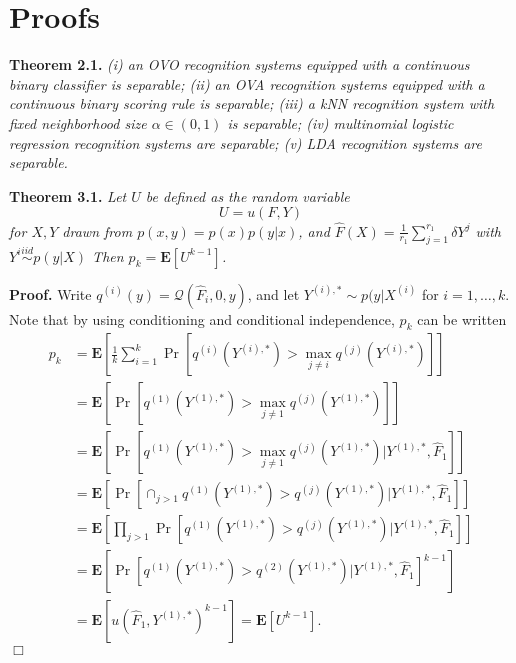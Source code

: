 \documentclass[12pt]{article}
\begin{document}
\maketitle

\newcommand{\tr}{\text{tr}}
\newcommand{\E}{\textbf{E}}
\newcommand{\diag}{\text{diag}}
\newcommand{\argmax}{\text{argmax}}
\newcommand{\Cov}{\text{Cov}}
\newcommand{\Var}{\text{Var}}
\newcommand{\argmin}{\text{argmin}}
\newcommand{\Vol}{\text{Vol}}
\newcommand{\comm}[1]{}
\newcommand{\indep}{\rotatebox[origin=c]{90}{$\models$}}
\newcommand{\Cor}{\text{Cor}}

\section{Proofs}

\textbf{Theorem 2.1.} \emph{(i) an OVO recognition systems equipped with a continuous binary classifier is separable; (ii) an OVA recognition systems equipped with a continuous binary scoring rule is separable;
(iii) a kNN recognition system with fixed neighborhood size $\alpha \in (0, 1)$ is separable; (iv) multinomial logistic regression recognition systems are separable; (v) LDA recognition systems are separable.}

\noindent\textbf{Theorem 3.1.} \emph{
Let $U$ be defined as the random variable
\[U = u(F, Y)\]
for $X, Y$ drawn from $p(x, y) = p(x) p(y|x)$,
and $\hat{F}(X) = \frac{1}{r_1}\sum_{j=1}^{r_1} \delta{Y^j}$ with $Y^i \stackrel{iid}{\sim} p(y|X)$
Then $p_k = \E[U^{k-1}]$.
}

\noindent\textbf{Proof.}  
Write $q^{(i)}(y) = \mathcal{Q}(\hat{F}_i, 0, y)$, and let $Y^{(i), *} \sim p(y|X^{(i)}$ for $i = 1,\hdots, k$.
Note that by using conditioning and
conditional independence, $p_k$ can be written
\begin{align*}
p_k &= \E\left[ \frac{1}{k}\sum_{i=1}^k  \Pr[q^{(i)}(Y^{(i), *}) > \max_{j\neq i} q^{(j)}(Y^{(i), *})] \right]
\\&= \E\left[ \Pr[q^{(1)}(Y^{(1), *}) > \max_{j\neq 1} q^{(j)}(Y^{(1), *})] \right]
\\&= \E[\Pr[q^{(1)}(Y^{(1), *}) > \max_{j\neq 1} q^{(j)}(Y^{(1), *})|Y^{(1), *}, \hat{F}_1]]
\\&= \E[\Pr[\cap_{j > 1} q^{(1)}(Y^{(1), *}) > q^{(j)}(Y^{(1), *})|Y^{(1), *}, \hat{F}_1]]
\\&= \E[\prod_{j > 1}\Pr[q^{(1)}(Y^{(1), *}) > q^{(j)}(Y^{(1), *})|Y^{(1), *}, \hat{F}_1]]
\\&= \E[\Pr[q^{(1)}(Y^{(1), *}) > q^{(2)}(Y^{(1), *})|Y^{(1), *}, \hat{F}_1]^{k-1}]
\\&= \E[u(\hat{F}_1, Y^{(1), *})^{k-1}] = \E[U^{k-1}].
\end{align*}
$\Box$
\end{document}
